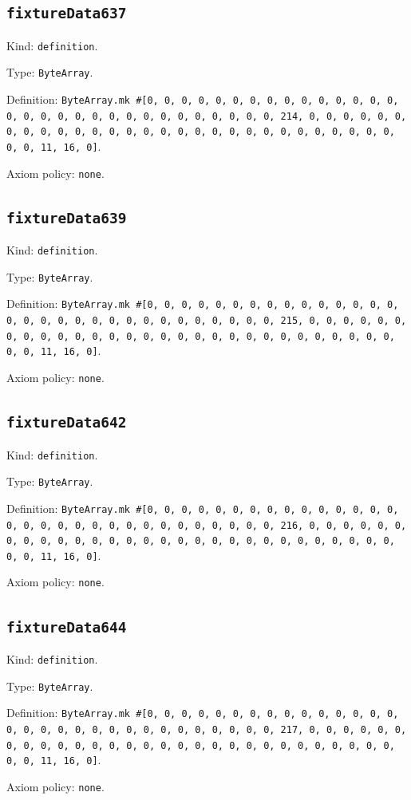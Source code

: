 \documentclass[11pt]{article}
\begin{document}
\subsection*{\texttt{fixtureData637}}
\noindent Kind: \texttt{definition}.\par
\noindent Type: \texttt{ByteArray}.\par
\noindent Definition: \texttt{ByteArray.mk \#[0, 0, 0, 0, 0, 0, 0, 0, 0, 0, 0, 0, 0, 0, 0, 0, 0, 0, 0, 0, 0, 0, 0, 0, 0, 0, 0, 0, 0, 0, 0, 214, 0, 0, 0, 0, 0, 0, 0, 0, 0, 0, 0, 0, 0, 0, 0, 0, 0, 0, 0, 0, 0, 0, 0, 0, 0, 0, 0, 0, 0, 0, 0, 11, 16, 0]}.\par
\noindent Axiom policy: \texttt{none}.\par
\subsection*{\texttt{fixtureData639}}
\noindent Kind: \texttt{definition}.\par
\noindent Type: \texttt{ByteArray}.\par
\noindent Definition: \texttt{ByteArray.mk \#[0, 0, 0, 0, 0, 0, 0, 0, 0, 0, 0, 0, 0, 0, 0, 0, 0, 0, 0, 0, 0, 0, 0, 0, 0, 0, 0, 0, 0, 0, 0, 215, 0, 0, 0, 0, 0, 0, 0, 0, 0, 0, 0, 0, 0, 0, 0, 0, 0, 0, 0, 0, 0, 0, 0, 0, 0, 0, 0, 0, 0, 0, 0, 11, 16, 0]}.\par
\noindent Axiom policy: \texttt{none}.\par
\subsection*{\texttt{fixtureData642}}
\noindent Kind: \texttt{definition}.\par
\noindent Type: \texttt{ByteArray}.\par
\noindent Definition: \texttt{ByteArray.mk \#[0, 0, 0, 0, 0, 0, 0, 0, 0, 0, 0, 0, 0, 0, 0, 0, 0, 0, 0, 0, 0, 0, 0, 0, 0, 0, 0, 0, 0, 0, 0, 216, 0, 0, 0, 0, 0, 0, 0, 0, 0, 0, 0, 0, 0, 0, 0, 0, 0, 0, 0, 0, 0, 0, 0, 0, 0, 0, 0, 0, 0, 0, 0, 11, 16, 0]}.\par
\noindent Axiom policy: \texttt{none}.\par
\subsection*{\texttt{fixtureData644}}
\noindent Kind: \texttt{definition}.\par
\noindent Type: \texttt{ByteArray}.\par
\noindent Definition: \texttt{ByteArray.mk \#[0, 0, 0, 0, 0, 0, 0, 0, 0, 0, 0, 0, 0, 0, 0, 0, 0, 0, 0, 0, 0, 0, 0, 0, 0, 0, 0, 0, 0, 0, 0, 217, 0, 0, 0, 0, 0, 0, 0, 0, 0, 0, 0, 0, 0, 0, 0, 0, 0, 0, 0, 0, 0, 0, 0, 0, 0, 0, 0, 0, 0, 0, 0, 11, 16, 0]}.\par
\noindent Axiom policy: \texttt{none}.\par
\end{document}
